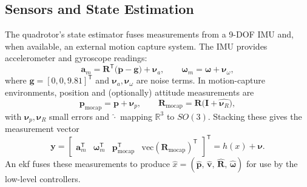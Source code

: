 \subsection{Sensors and State Estimation}
\label{sec:quadrotor_estimation}
The quadrotor’s state estimator fuses measurements from a 9-DOF IMU and, when available, an external motion capture system. The IMU provides accelerometer and gyroscope readings:
\begin{equation}
\mathbf{a}_m = \mathbf{R}^\mathsf{T}\bigl(\ddot{\mathbf{p}} - \mathbf{g}\bigr) + \boldsymbol{\nu}_a,\qquad
\boldsymbol{\omega}_m = \boldsymbol{\omega} + \boldsymbol{\nu}_\omega,
\end{equation}
where \(\mathbf{g}=[0,0,9.81]^\mathsf{T}\) and \(\boldsymbol{\nu}_a,\boldsymbol{\nu}_\omega\) are noise terms. In motion-capture environments, position and (optionally) attitude measurements are
\begin{equation}
\mathbf{p}_{\mathrm{mocap}} = \mathbf{p} + \boldsymbol{\nu}_p,\qquad
\mathbf{R}_{\mathrm{mocap}} = \mathbf{R}\bigl(\mathbf{I} + \widehat{\boldsymbol{\nu}_R}\bigr),
\end{equation}
with \(\boldsymbol{\nu}_p,\boldsymbol{\nu}_R\) small errors and \(\widehat{\cdot}\) mapping \(\mathbb{R}^3\) to \(SO(3)\). Stacking these gives the measurement vector
\begin{equation}
\mathbf{y} = \begin{bmatrix}
\mathbf{a}_m^\mathsf{T} & \boldsymbol{\omega}_m^\mathsf{T} & \mathbf{p}_{\mathrm{mocap}}^\mathsf{T} & \mathrm{vec}(\mathbf{R}_{\mathrm{mocap}})^\mathsf{T}
\end{bmatrix}^\mathsf{T} = h(x) + \boldsymbol{\nu}.
\end{equation}
An \gls{ekf} fuses these measurements to produce \(\hat{x} = (\hat{\mathbf{p}},\,\hat{\mathbf{v}},\,\hat{\mathbf{R}},\,\hat{\boldsymbol{\omega}})\) for use by the low-level controllers.
